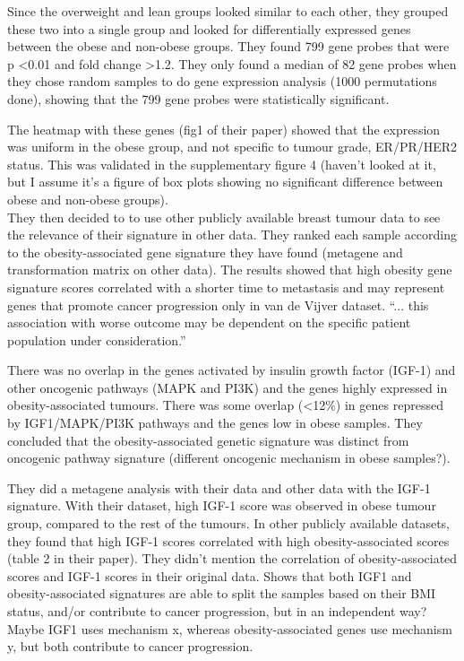 \documentclass[a4paper, 11pt]{article}
\begin{document}
Since the overweight and lean groups looked similar to each other, they grouped these two into a single group and looked for differentially expressed genes between the obese and non-obese groups.
They found 799 gene probes that were p \textless 0.01 and fold change \textgreater 1.2.
They only found a median of 82 gene probes when they chose random samples to do gene expression analysis (1000 permutations done), showing that the 799 gene probes were statistically significant.

The heatmap with these genes (fig1 of their paper) showed that the expression was uniform in the obese group, and not specific to tumour grade, ER/PR/HER2 status.
This was validated in the supplementary figure 4 (haven't looked at it, but I assume it's a figure of box plots showing no significant difference between obese and non-obese groups).\\

They then decided to to use other publicly available breast tumour data to see the relevance of their signature in other data.
They ranked each sample according to the obesity-associated gene signature they have found (metagene and transformation matrix on other data).
The results showed that high obesity gene signature scores correlated with a shorter time to metastasis and may represent genes that promote cancer progression only in van de Vijver dataset.
``... this association with worse outcome may be dependent on the specific patient population under consideration.''

There was no overlap in the genes activated by insulin growth factor (IGF-1) and other oncogenic pathways (MAPK and PI3K) and the genes highly expressed in obesity-associated tumours.
There was some overlap (\textless 12\%) in genes repressed by IGF1/MAPK/PI3K pathways and the genes low in obese samples.
They concluded that the obesity-associated genetic signature was distinct from oncogenic pathway signature (different oncogenic mechanism in obese samples?).

They did a metagene analysis with their data and other data with the IGF-1 signature.
With their dataset, high IGF-1 score was observed in obese tumour group, compared to the rest of the tumours.
In other publicly available datasets, they found that high IGF-1 scores correlated with high obesity-associated scores (table 2 in their paper).
They didn't mention the correlation of obesity-associated scores and IGF-1 scores in their original data.
Shows that both IGF1 and obesity-associated signatures are able to split the samples based on their BMI status, and/or contribute to cancer progression, but in an independent way?
Maybe IGF1 uses mechanism x, whereas obesity-associated genes use mechanism y, but both contribute to cancer progression.
\end{document}
